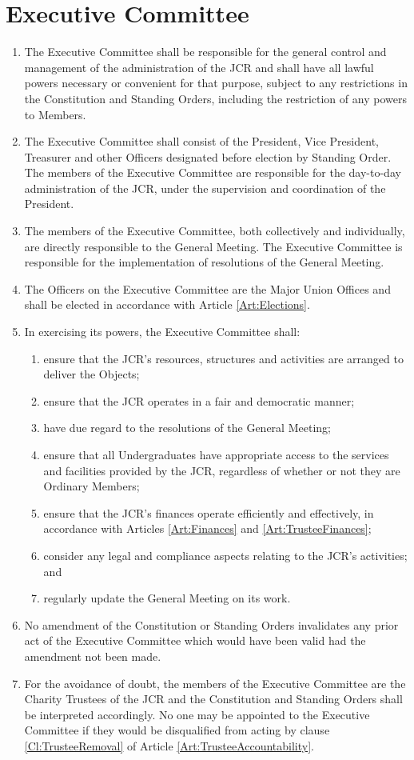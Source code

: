 \documentclass[11pt,a4paper, oneside]{memoir}
\begin{document}
	\section{Executive Committee} \label{Art:Executive} \label{Art:TrusteeBoard}
	\begin{enumerate}
		\item The Executive Committee shall be responsible for the general control and management of the administration of the JCR and shall have all lawful powers necessary or convenient for that purpose, subject to any restrictions in the Constitution and Standing Orders, including the restriction of any powers to Members.
		\item The Executive Committee shall consist of the President, Vice President, Treasurer and other Officers designated before election by Standing Order.
		The members of the Executive Committee are responsible for the day-to-day administration of the JCR, under the supervision and coordination of the President.
		\item The members of the Executive Committee, both collectively and individually, are directly responsible to the General Meeting.
		The Executive Committee is responsible for the implementation of resolutions of the General Meeting.
		\item The Officers on the Executive Committee are the Major Union Offices and shall be elected in accordance with Article \ref{Art:Elections}.
		\item In exercising its powers, the Executive Committee shall:
		\begin{enumerate}
			\item ensure that the JCR's resources, structures and activities are arranged to deliver the Objects;
			\item ensure that the JCR operates in a fair and democratic manner;
			\item have due regard to the resolutions of the General Meeting;
			\item ensure that all Undergraduates have appropriate access to the services and facilities provided by the JCR, regardless of whether or not they are Ordinary Members;
			\item ensure that the JCR's finances operate efficiently and effectively, in accordance with Articles \ref{Art:Finances} and \ref{Art:TrusteeFinances};
			\item consider any legal and compliance aspects relating to the JCR's activities; and
			\item regularly update the General Meeting on its work.
		\end{enumerate}
		\item No amendment of the Constitution or Standing Orders invalidates any prior act of the Executive Committee which would have been valid had the amendment not been made.
		\item For the avoidance of doubt, the members of the Executive Committee are the Charity Trustees of the JCR and the Constitution and Standing Orders shall be interpreted accordingly.
		No one may be appointed to the Executive Committee if they would be disqualified from acting by clause \ref{Cl:TrusteeRemoval} of Article \ref{Art:TrusteeAccountability}.
	\end{enumerate}
\end{document}
